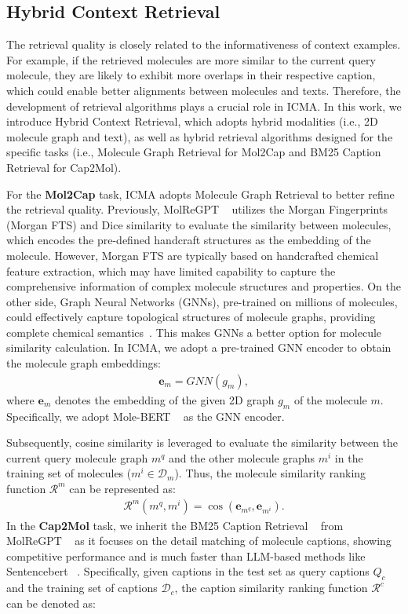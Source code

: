 \subsection{Hybrid Context Retrieval}
The retrieval quality is closely related to the informativeness of context examples. For example, if the retrieved molecules are more similar to the current query molecule, they are likely to exhibit more overlaps in their respective caption, which could enable better alignments between molecules and texts. Therefore, the development of retrieval algorithms plays a crucial role in ICMA. In this work, we introduce Hybrid Context Retrieval, which adopts hybrid modalities (i.e., 2D molecule graph and text), as well as hybrid retrieval algorithms designed for the specific tasks (i.e., Molecule Graph Retrieval for Mol2Cap and BM25 Caption Retrieval for Cap2Mol). 

For the \textbf{Mol2Cap} task, ICMA adopts Molecule Graph Retrieval to better refine the retrieval quality.
Previously, MolReGPT ~\cite{li2023empowering} utilizes the Morgan Fingerprints (Morgan FTS) and Dice similarity to evaluate the similarity between molecules, which encodes the pre-defined handcraft structures as the embedding of the molecule. However, Morgan FTS are typically based on handcrafted chemical feature extraction, which may have limited capability to capture the comprehensive information of complex molecule structures and properties. On the other side, Graph Neural Networks (GNNs), pre-trained on millions of molecules, could effectively capture topological structures of molecule graphs, providing complete chemical semantics~\cite{ijcai2023p760}. This makes GNNs a better option for molecule similarity calculation.
In ICMA, we adopt a pre-trained GNN encoder to obtain the molecule graph embeddings:
\begin{align}
    \textbf{e}_m = G\!N\!N(g_m),
\end{align}
where $\textbf{e}_m$ denotes the embedding of the given 2D graph $g_m$ of the molecule $m$. Specifically, we adopt Mole-BERT ~\cite{xia2022mole} as the GNN encoder. 

Subsequently, cosine similarity is leveraged to evaluate the similarity between the current query molecule graph $m^q$ and the other molecule graphs $m^i$ in the training set of molecules ($m^i \in \mathcal{D}_m$). Thus, the molecule similarity ranking function $\mathcal{R}^m$ can be represented as:
\begin{align}
    \mathcal{R}^m(m^q, m^i) = \cos{(\textbf{e}_{m^q}, \textbf{e}_{m^i})}.
\end{align}
In the \textbf{Cap2Mol} task, we inherit the BM25 Caption Retrieval ~\cite{robertson2009probabilistic} from MolReGPT ~\cite{li2023empowering} as it focuses on the detail matching of molecule captions, showing competitive performance and is much faster than LLM-based methods like Sentencebert ~\cite{reimers2019sentence}. Specifically, given captions in the test set as query captions $Q_c$ and the training set of captions $\mathcal{D}_c$, the caption similarity ranking function $\mathcal{R}^c$ can be denoted as:

